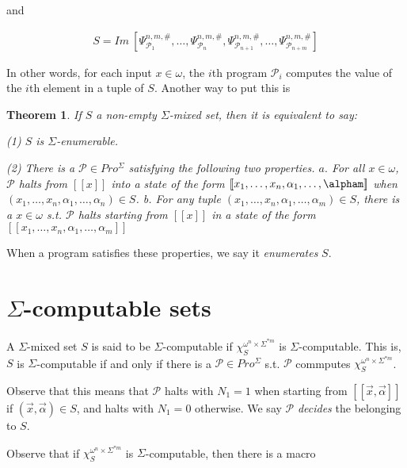 \documentclass[a4paper, 12pt]{article}
\newtheorem{theorem}{Theorem}
\newtheorem{theorem}{Theorem}
\begin{document}
and 

\begin{align*}
    S = Im ~ \left[ \Psi_{\mathcal{P}_1}^{n, m, \#}, \ldots,
    \Psi_{\mathcal{P}_n}^{n, m, \#}, \Psi_{\mathcal{P}_{n+1}}^{n, m, \#},
\ldots, \Psi_{\mathcal{P}_{n+m}}^{n, m, \#} \right] 
\end{align*}

In other words, for each input $x \in \omega$, the $i$th program $\mathcal{P}_i$
computes the value of the $i$th element in a tuple of $S$. Another way to put
this is 


\begin{theorem}
    If $S$ a non-empty $\Sigma$-mixed set, then it is equivalent to say: 

    \textit{(1)} $S$ is $\Sigma$-enumerable. 

    \textit{(2)} There is a $\mathcal{P} \in Pro^{\Sigma}$ satisfying the
    following two properties. $a.$ For all $x \in \omega$, $\mathcal{P}$ halts
    from $[\![ x ]\!]$ into a state of the form $[\![ x_1, \ldots, x_n,
    \alpha_1, \ldots, \alpham ]\!]$ when $(x_1, \ldots, x_n, \alpha_1, \ldots,
    \alpha_n) \in S$. \textit{b.} For any tuple $(x_1, \ldots, x_n, \alpha_1, \ldots, \alpha_m) \in
S$, there is a $x \in \omega$ s.t. $\mathcal{P}$ halts starting from $[\![ x
]\!]$ in a state of the form $[\![ x_1, \ldots, x_n, \alpha_1, \ldots, \alpha_m ]\!]$ 

\end{theorem}

When a program satisfies these properties, we say it \textit{enumerates} $S$.

\section{$\Sigma$-computable sets}

A $\Sigma$-mixed set $S$ is said to be $\Sigma$-computable if
$\chi_{S}^{\omega^n \times \Sigma^{*m}}$ is $\Sigma$-computable. This is, $S$ is
$\Sigma$-computable if and only if there is a $\mathcal{P} \in Pro^{\Sigma}$
s.t. $\mathcal{P}$ commputes $\chi_S^{\omega^n \times \Sigma^{*m}}$. 

Observe that this means that $\mathcal{P}$ halts with $N_1 = 1$ when starting
from $[\![ \overrightarrow{x}, \overrightarrow{\alpha} ]\!]$ if
$(\overrightarrow{x}, \overrightarrow{\alpha}) \in S$, and halts with $N_1 = 0$
otherwise. We say $\mathcal{P}$ \textit{decides} the belonging to $S$.

Observe that if $\chi_S^{\omega^n \times \Sigma^{*m}}$ is $\Sigma$-computable,
then there is a macro 
\end{document}
